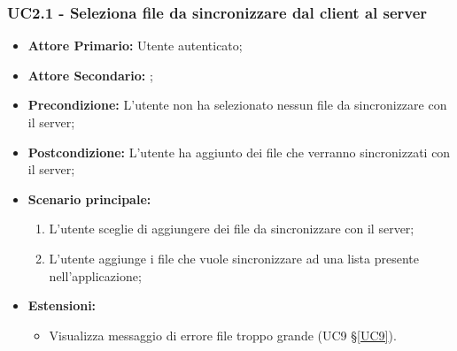 \subsubsection{UC2.1 - Seleziona file da sincronizzare dal client al server}
\begin{itemize}
\item \textbf{Attore Primario:} Utente autenticato;
\item \textbf{Attore Secondario:} ;
\item \textbf{Precondizione:} L'utente non ha selezionato nessun file da sincronizzare con il server;
\item \textbf{Postcondizione:} L'utente ha aggiunto dei file che verranno sincronizzati con il server;
\item \textbf{Scenario principale:}
    \begin{enumerate}
    \item L'utente sceglie di aggiungere dei file da sincronizzare con il server;
    \item L'utente aggiunge i file che vuole sincronizzare ad una lista presente nell'applicazione;
    \end{enumerate}
\item \textbf{Estensioni:}
    \begin{itemize}
    \item Visualizza messaggio di errore file troppo grande (UC9 \S{}\ref{UC9}).
    \end{itemize}
\end{itemize}
